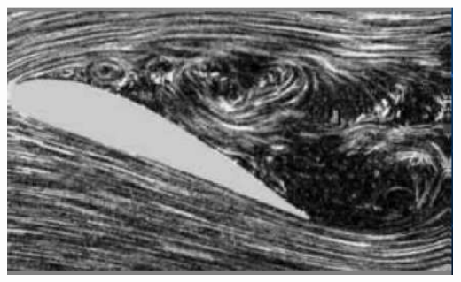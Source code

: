 \begin{center}
	\includegraphics[width=0.7\linewidth]{TeX_files/chapter09-Externo/perdida}
\end{center}
	
